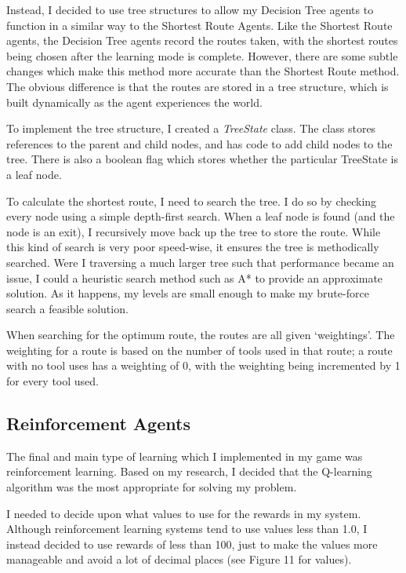 \documentclass[a4paper,oneside]{report}
\begin{document}
Instead, I decided to use tree structures to allow my Decision Tree agents to function in a similar way to the Shortest Route Agents. Like the Shortest Route agents, the Decision Tree agents record the routes taken, with the shortest routes being chosen after the learning mode is complete. However, there are some subtle changes which make this method more accurate than the Shortest Route method. The obvious difference is that the routes are stored in a tree structure, which is built dynamically as the agent experiences the world. 

To implement the tree structure, I created a \emph{TreeState} class. The class stores references to the parent and child nodes, and has code to add child nodes to the tree. There is also a boolean flag which stores whether the particular TreeState is a leaf node.

To calculate the shortest route, I need to search the tree. I do so by checking every node using a simple depth-first search. When a leaf node is found (and the node is an exit), I recursively move back up the tree to store the route. While this kind of search is very poor speed-wise, it ensures the tree is methodically searched. Were I traversing a much larger tree such that performance became an issue, I could a heuristic search method such as A* to provide an approximate solution. As it happens, my levels are small enough to make my brute-force search a feasible solution.

When searching for the optimum route, the routes are all given `weightings'. The weighting for a route is based on the number of tools used in that route; a route with no tool uses has a weighting of 0, with the weighting being incremented by 1 for every tool used.

\subsection{Reinforcement Agents}

The final and main type of learning which I implemented in my game was reinforcement learning. Based on my research, I decided that the Q-learning algorithm was the most appropriate for solving my problem.

I needed to decide upon what values to use for the rewards in my system. Although reinforcement learning systems tend to use values less than 1.0, I instead decided to use rewards of less than 100, just to make the values more manageable and avoid a lot of decimal places (see Figure 11 for values).
\end{document}
